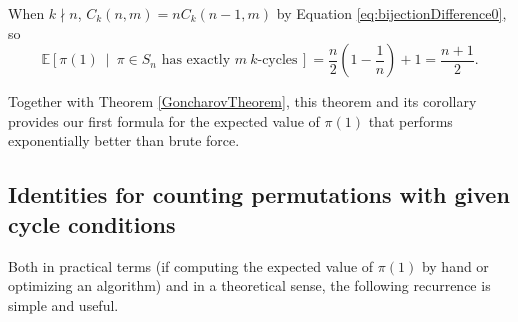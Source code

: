 \begin{corollary}
  \label{cor:kNotDivideN}
  When $k \nmid n$, $C_k(n,m) = nC_k(n-1,m)$ by Equation \ref{eq:bijectionDifference0},
  so \begin{equation}
    \mathbb E[\pi(1)\ \mid\ \pi \in S_n \text{ has exactly } m\ k\text{-cycles}\,] = \frac{n}{2}\left(1 - \frac{1}{n}\right) + 1 = \frac{n+1}{2}.
  \end{equation}
\end{corollary}
Together with Theorem \ref{GoncharovTheorem}, this theorem and its corollary
provides our first formula for the expected value of $\pi(1)$ that
performs exponentially better than brute force.

\subsection{Identities for counting permutations with given cycle conditions}
Both in practical terms (if computing the expected value of $\pi(1)$ by hand or
optimizing an algorithm) and in a theoretical sense, the following recurrence is
simple and useful.

